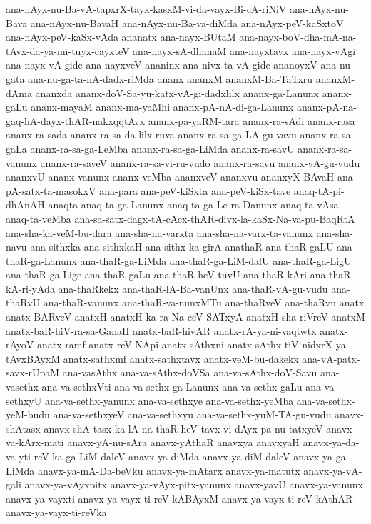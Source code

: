 {ana-nAyx-nu-Ba-vA-tapxrX-tayx-kasxM-vi-da-vayx-Bi-cA-riNiV
ana-nAyx-nu-Bava
ana-nAyx-nu-BavaH
ana-nAyx-nu-Ba-va-diMda
ana-nAyx-peV-kaSxtoV
ana-nAyx-peV-kaSx-vAda
ananatx
ana-nayx-BUtaM
ana-nayx-boV-dha-mA-na-tAvx-da-ya-mi-tuyx-cayxteV
ana-nayx-sA-dhanaM
ana-nayxtavx
ana-nayx-vAgi
ana-nayx-vA-gide
ana-nayxveV
ananinx
ana-nivx-ta-vA-gide
ananoyxV
ana-nu-gata
ana-nu-ga-ta-nA-dadx-riMda
ananx
ananxM
ananxM-Ba-TaTxru
ananxM-dAma
ananxda
ananx-doV-Sa-yu-katx-vA-gi-dadxlilx
ananx-ga-Lanunx
ananx-gaLu
ananx-mayaM
ananx-ma-yaMhi
ananx-pA-nA-di-ga-Lanunx
ananx-pA-na-gaq-hA-dayx-thAR-nakxqqtAvx
ananx-pa-yaRM-tara
ananx-ra-sAdi
ananx-rasa
ananx-ra-sada
ananx-ra-sa-da-lilx-ruva
ananx-ra-sa-ga-LA-gu-vavu
ananx-ra-sa-gaLa
ananx-ra-sa-ga-LeMba
ananx-ra-sa-ga-LiMda
ananx-ra-savU
ananx-ra-sa-vanunx
ananx-ra-saveV
ananx-ra-sa-vi-ru-vudo
ananx-ra-savu
ananx-vA-gu-vudu
ananxvU
ananx-vanunx
ananx-veMba
ananxveV
ananxvu
ananxyX-BAvaH
ana-pA-satx-ta-masokxV
ana-para
ana-peV-kiSxta
ana-peV-kiSx-tave
anaq-tA-pi-dhAnAH
anaqta
anaq-ta-ga-Lanunx
anaq-ta-ga-Le-ra-Danunx
anaq-ta-vAsa
anaq-ta-veMba
ana-sa-satx-dagx-tA-cAcx-thAR-divx-la-kaSx-Na-va-pu-BaqRtA
ana-sha-ka-veM-bu-dara
ana-sha-na-varxta
ana-sha-na-varx-ta-vanunx
ana-sha-navu
ana-sithxka
ana-sithxkaH
ana-sithx-ka-girA
anathaR
ana-thaR-gaLU
ana-thaR-ga-Lanunx
ana-thaR-ga-LiMda
ana-thaR-ga-LiM-dalU
ana-thaR-ga-LigU
ana-thaR-ga-Lige
ana-thaR-gaLu
ana-thaR-heV-tuvU
ana-thaR-kAri
ana-thaR-kA-ri-yAda
ana-thaRkekx
ana-thaR-lA-Ba-vanUnx
ana-thaR-vA-gu-vudu
ana-thaRvU
ana-thaR-vanunx
ana-thaR-va-nunxMTu
ana-thaRveV
ana-thaRvu
anatx
anatx-BARveV
anatxH
anatxH-ka-ra-Na-ceV-SATxyA
anatxH-sha-riVreV
anatxM
anatx-baR-hiV-ra-sa-GanaH
anatx-baR-hivAR
anatx-rA-ya-ni-vaqtwtx
anatx-rAyoV
anatx-ramf
anatx-reV-NApi
anatx-sAthxni
anatx-sAthx-tiV-nidxrX-ya-tAvxBAyxM
anatx-sathxmf
anatx-sathxtavx
anatx-veM-bu-dakekx
ana-vA-patx-savx-rUpaM
ana-vasAthx
ana-va-sAthx-doVSa
ana-va-sAthx-doV-Savu
ana-vasethx
ana-va-sethxVti
ana-va-sethx-ga-Lanunx
ana-va-sethx-gaLu
ana-va-sethxyU
ana-va-sethx-yanunx
ana-va-sethxye
ana-va-sethx-yeMba
ana-va-sethx-yeM-budu
ana-va-sethxyeV
ana-va-sethxyu
ana-va-sethx-yuM-TA-gu-vudu
anavx-shAtasx
anavx-shA-tasx-ka-lA-na-thaR-heV-tavx-vi-dAyx-pa-nu-tatxyeV
anavx-va-kArx-mati
anavx-yA-nu-sAra
anavx-yAthaR
anavxya
anavxyaH
anavx-ya-da-va-yti-reV-ka-ga-LiM-daleV
anavx-ya-diMda
anavx-ya-diM-daleV
anavx-ya-ga-LiMda
anavx-ya-mA-Da-beVku
anavx-ya-mAtarx
anavx-ya-matutx
anavx-ya-vA-gali
anavx-ya-vAyxpitx
anavx-ya-vAyx-pitx-yanunx
anavx-yavU
anavx-ya-vanunx
anavx-ya-vayxti
anavx-ya-vayx-ti-reV-kABAyxM
anavx-ya-vayx-ti-reV-kAthAR
anavx-ya-vayx-ti-reVka
}
